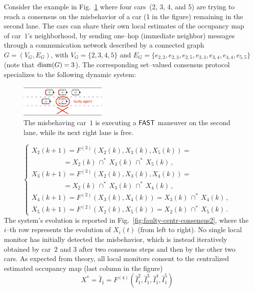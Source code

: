 Consider the example in Fig.~\ref{fig:faulty-centr-example} where four cars~(2, 3, 4, and 5) are trying to reach a consensus on the misbehavior of a car (1 in the figure) remaining in the second lane. The cars can share their own local estimates of the occupancy map of car~$1$'s neighborhood, by sending one--hop (immediate neighbor) messages through a communication network described by a connected graph $G=(V_G,E_G)$, with $V_G = \{ 2, 3, 4, 5 \}$ and $E_G = \{e_{2,2}, e_{2,3}, e_{2,5}, e_{3,3}, e_{3,4}, e_{4,4},e_{5,5}\}$ (note that $\mathrm{diam}(G)=3$). The corresponding set--valued consensus protocol specializes to the following dynamic system:
\begin{figure}[t!]
\centering
\includegraphics[width=0.38\textwidth,clip]{images/frame-b.pdf}
\caption{The misbehaving car~$1$ is executing a $\mfast$ maneuver on the second lane, while its next right lane is free.}
\label{fig:faulty-centr-example}
\end{figure}
\begin{equation*}
\left\lbrace
\begin{array}{l}
X_2(k+1) = F^{(3)}(X_2(k), X_3(k), X_5(k)) =  \\
\;\;\;\;\;\;\;\;\;\;\;\;\;\;\;\;\, = X_2(k) \, \cap^* \, X_3(k) \, \cap^* \, X_5(k) \, , \\
X_3(k+1) = F^{(3)}(X_2(k), X_3(k), X_4(k)) =  \\
\;\;\;\;\;\;\;\;\;\;\;\;\;\;\;\;\, = X_2(k) \, \cap^* \, X_3(k) \, \cap^* \, X_4(k) \, , \\
X_4(k+1) =  F^{(2)}(X_3(k), X_4(k)) = X_3(k) \, \cap^* \, X_4(k) \, , \\
X_5(k+1) =  F^{(2)}(X_2(k), X_5(k)) =  X_2(k) \, \cap^* \, X_5(k) \, .
\end{array}
\right.
\end{equation*}
The system's evolution is reported in Fig.~\ref{fig:faulty-centr-consensus2}, where the $i$--th row represents the evolution of $X_i(t)$ (from left to right). No single local monitor has initially detected the misbehavior, which is instead iteratively obtained by car~$2$ and $3$ after two consensus steps and then by the other two cars. As expected from theory, all local monitors consent to the centralized estimated occupancy map (last column in the figure) 
$$
X^* = \hat{I}_1 = F^{(4)}(\hat{I}_1^2, \hat{I}_1^3, \hat{I}_1^4, \hat{I}_1^5)
$$
